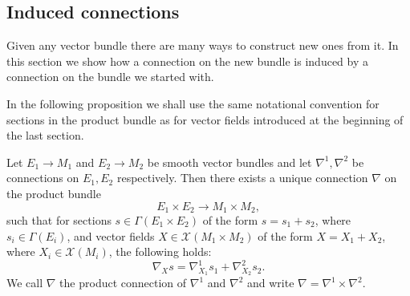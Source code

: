\subsection{Induced connections}
Given any vector bundle there are many ways to construct new ones from it. In this section we show how a connection on the new bundle is induced by a connection on the bundle we started with.

In the following proposition we shall use the same notational convention for sections in the product bundle as for vector fields
introduced at the beginning of the last section.

\begin{proposition}
    \label{riem_mnf:prop:product_connections}
    Let $E_1 \to M_1$ and $E_2 \to M_2$ be smooth vector bundles and let $\nabla^1, \nabla^2$ be connections on $E_1,E_2$ respectively. Then there exists a unique connection $\nabla$ on the product bundle
    \[
    E_1\times E_2 \to M_1\times M_2,
    \]
    such that for sections $s \in \Gamma(E_1\times E_2)$ of the form $s = s_1 + s_2$, where $s_i \in \Gamma(E_i)$, and vector fields $X \in \mathscr{X}(M_1\times M_2)$ of the form $X=X_1 + X_2$, where $X_i \in \mathscr{X}(M_i)$, the following holds:
    \[
    \nabla_X s = \nabla^1_{X_1}s_1 + \nabla^2_{X_2}s_2.
    \]
    We call $\nabla$ the product connection of $\nabla^1$ and $\nabla^2$ and write $\nabla = \nabla^1 \times \nabla^2$.
\end{proposition}

